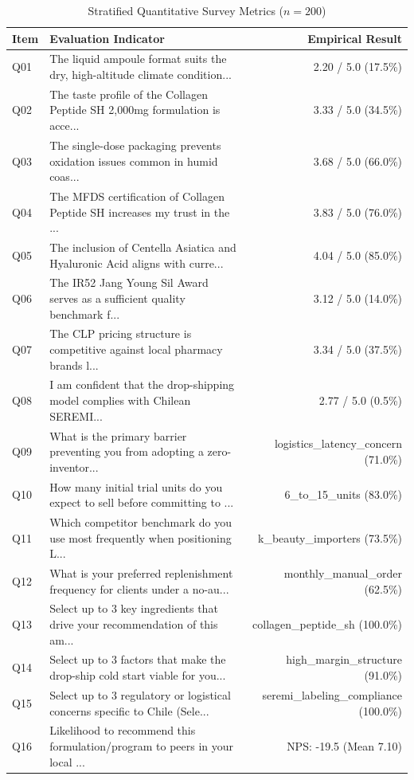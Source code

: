 \documentclass[10pt,twocolumn,a4paper]{article}
\begin{document}
\begin{table}[t]
\centering
\caption{Stratified Quantitative Survey Metrics ($n = 200$)}
\label{tab:metrics}
\small
\begin{tabularx}{\textwidth}{l X r}
\toprule
\textbf{Item} & \textbf{Evaluation Indicator} & \textbf{Empirical Result} \\
\midrule
Q01 & The liquid ampoule format suits the dry, high-altitude climate condition... & 2.20 / 5.0 (17.5\%) \\
Q02 & The taste profile of the Collagen Peptide SH 2,000mg formulation is acce... & 3.33 / 5.0 (34.5\%) \\
Q03 & The single-dose packaging prevents oxidation issues common in humid coas... & 3.68 / 5.0 (66.0\%) \\
Q04 & The MFDS certification of Collagen Peptide SH increases my trust in the ... & 3.83 / 5.0 (76.0\%) \\
Q05 & The inclusion of Centella Asiatica and Hyaluronic Acid aligns with curre... & 4.04 / 5.0 (85.0\%) \\
Q06 & The IR52 Jang Young Sil Award serves as a sufficient quality benchmark f... & 3.12 / 5.0 (14.0\%) \\
Q07 & The CLP pricing structure is competitive against local pharmacy brands l... & 3.34 / 5.0 (37.5\%) \\
Q08 & I am confident that the drop-shipping model complies with Chilean SEREMI... & 2.77 / 5.0 (0.5\%) \\
Q09 & What is the primary barrier preventing you from adopting a zero-inventor... & logistics\_latency\_concern (71.0\%) \\
Q10 & How many initial trial units do you expect to sell before committing to ... & 6\_to\_15\_units (83.0\%) \\
Q11 & Which competitor benchmark do you use most frequently when positioning L... & k\_beauty\_importers (73.5\%) \\
Q12 & What is your preferred replenishment frequency for clients under a no-au... & monthly\_manual\_order (62.5\%) \\
Q13 & Select up to 3 key ingredients that drive your recommendation of this am... & collagen\_peptide\_sh (100.0\%) \\
Q14 & Select up to 3 factors that make the drop-ship cold start viable for you... & high\_margin\_structure (91.0\%) \\
Q15 & Select up to 3 regulatory or logistical concerns specific to Chile (Sele... & seremi\_labeling\_compliance (100.0\%) \\
Q16 & Likelihood to recommend this formulation/program to peers in your local ... & NPS: -19.5 (Mean 7.10) \\
\bottomrule
\end{tabularx}
\end{table}
\end{document}
